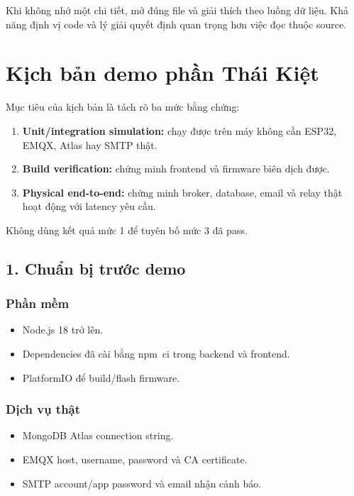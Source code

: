 \documentclass[11pt,oneside,openany]{book}
\renewcommand{\texttt}[1]{{\ttfamily\small #1}}
\providecommand{\tightlist}{\setlength{\itemsep}{1pt}\setlength{\parskip}{0pt}}
\begin{document}
Khi không nhớ một chi tiết, mở đúng file và giải thích theo luồng dữ
liệu. Khả năng định vị code và lý giải quyết định quan trọng hơn việc
đọc thuộc source.

\chapter{Kịch bản demo phần Thái
Kiệt}\label{kux1ecbch-bux1ea3n-demo-phux1ea7n-thuxe1i-kiux1ec7t}

Mục tiêu của kịch bản là tách rõ ba mức bằng chứng:

\begin{enumerate}
\def\labelenumi{\arabic{enumi}.}
\tightlist
\item
  \textbf{Unit/integration simulation:} chạy được trên máy không cần
  ESP32, EMQX, Atlas hay SMTP thật.
\item
  \textbf{Build verification:} chứng minh frontend và firmware biên dịch
  được.
\item
  \textbf{Physical end-to-end:} chứng minh broker, database, email và
  relay thật hoạt động với latency yêu cầu.
\end{enumerate}

Không dùng kết quả mức 1 để tuyên bố mức 3 đã pass.

\section{1. Chuẩn bị trước
demo}\label{1-chuux1ea9n-bux1ecb-trux1b0ux1edbc-demo}

\subsection{Phần mềm}\label{phux1ea7n-mux1ec1m}

\begin{itemize}
\tightlist
\item
  Node.js 18 trở lên.
\item
  Dependencies đã cài bằng \texttt{npm\ ci} trong \texttt{backend} và
  \texttt{frontend}.
\item
  PlatformIO để build/flash firmware.
\end{itemize}

\subsection{Dịch vụ thật}\label{dux1ecbch-vux1ee5-thux1eadt}

\begin{itemize}
\tightlist
\item
  MongoDB Atlas connection string.
\item
  EMQX host, username, password và CA certificate.
\item
  SMTP account/app password và email nhận cảnh báo.
\end{itemize}
\end{document}
